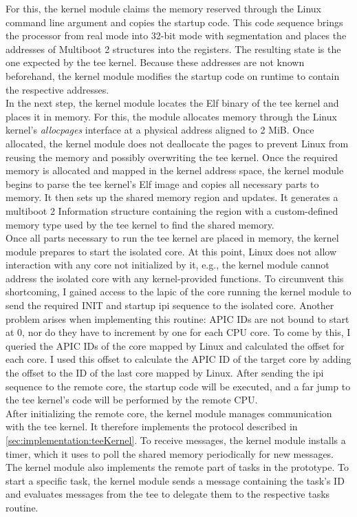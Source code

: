 For this, the kernel module claims the memory reserved through the Linux command
line argument and copies the startup code. This code sequence brings the
processor from real mode into 32-bit mode with segmentation and places the
addresses of Multiboot 2 structures into the registers. The resulting state is
the one expected by the \gls{tee} kernel. Because these addresses are not known
beforehand, the kernel module modifies the startup code on runtime to contain
the respective addresses.\\

In the next step, the kernel module locates the Elf binary of the \gls{tee}
kernel and places it in memory. For this, the module allocates memory through
the Linux kernel's \textit{allocpages} interface at a physical address aligned
to 2 MiB. Once allocated, the kernel module does not deallocate the pages to
prevent Linux from reusing the memory and possibly overwriting the \gls{tee}
kernel. Once the required memory is allocated and mapped in the kernel address
space, the kernel module begins to parse the \gls{tee} kernel's Elf image and
copies all necessary parts to memory. It then sets up the shared memory region
and updates. It generates a multiboot 2 Information structure containing the
region with a custom-defined memory type used by the \gls{tee} kernel to find
the shared memory.\\

Once all parts necessary to run the \gls{tee} kernel are placed in memory, the
kernel module prepares to start the isolated core. At this point, Linux does not
allow interaction with any core not initialized by it, e.g., the kernel module
cannot address the isolated core with any kernel-provided functions. To
circumvent this shortcoming, I gained access to the \gls{lapic} of the core
running the kernel module to send the required INIT and startup \gls{ipi}
sequence to the isolated core. Another problem arises when implementing this
routine: APIC IDs are not bound to start at 0, nor do they have to increment by
one for each CPU core. To come by this, I queried the APIC IDs of the core
mapped by Linux and calculated the offset for each core. I used this offset to
calculate the APIC ID of the target core by adding the offset to the ID of the
last core mapped by Linux. After sending the \gls{ipi} sequence to the remote
core, the startup code will be executed, and a far jump to the \gls{tee}
kernel's code will be performed by the remote CPU.\\

After initializing the remote core, the kernel module manages communication with
the \gls{tee} kernel. It therefore implements the protocol described in
\ref{sec:implementation:teeKernel}. To receive messages, the kernel module
installs a timer, which it uses to poll the shared memory periodically for new
messages. The kernel module also implements the remote part of tasks in the
prototype. To start a specific task, the kernel module sends a message
containing the task's ID and evaluates messages from the \gls{tee} to delegate
them to the respective tasks routine. \\

